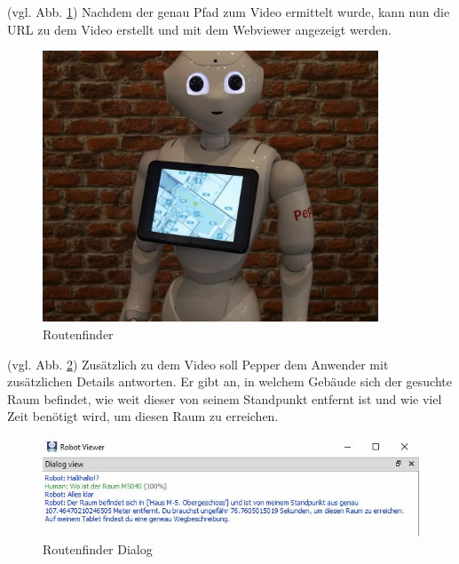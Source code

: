(vgl. Abb. \ref{fig:Routenfinder}) Nachdem der genau Pfad zum Video ermittelt wurde, kann nun die URL zu dem Video erstellt und mit dem Webviewer angezeigt werden.\\

\begin{figure}[H]
    \centering
    \includegraphics[width=10cm]{Figures/AppChapter/rx4.JPG}
    \caption{Routenfinder}
    \label{fig:Routenfinder}
    \centering
\end{figure}

(vgl. Abb. \ref{fig:RoutenfinderDia}) Zusätzlich zu dem Video soll Pepper dem Anwender mit zusätzlichen Details antworten. Er gibt an, in welchem Gebäude sich der gesuchte Raum befindet, 
wie weit dieser von seinem Standpunkt entfernt ist und wie viel Zeit benötigt wird, um diesen Raum zu erreichen.\\

\begin{figure}[H]
    \centering
    \includegraphics[width=\textwidth]{Figures/AppChapter/raumfinder_1.JPG}
    \caption{Routenfinder Dialog}
    \label{fig:RoutenfinderDia}
    \centering
\end{figure}

